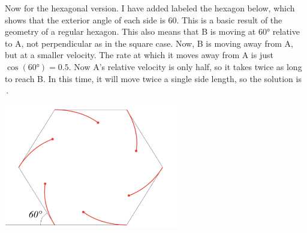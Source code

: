 \documentclass{article}
\begin{document}
Now for the hexagonal version.
I have added labeled the hexagon below, which shows that the exterior angle of each side is 60\textdegree.
This is a basic result of the geometry of a regular hexagon.
This also means that B is moving at \ang{60} relative to A, not perpendicular as in the square case.
Now, B is moving away from A, but at a smaller velocity.
The rate at which it moves away from A is just $\cos(\ang{60})=0.5$.
Now A's relative velocity is only half, so it takes twice as long to reach B.
In this time, it will move twice a single side length, so the solution is
\,.

\begin{center}
\includegraphics[width=3in]{hexagon2.png}
\end{center}
\end{document}
